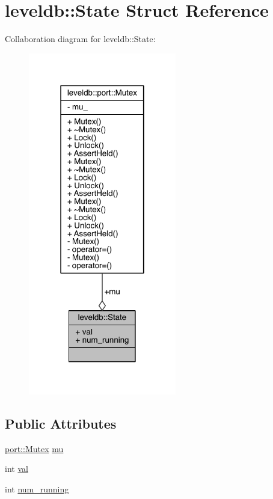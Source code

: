 \hypertarget{structleveldb_1_1_state}{}\section{leveldb\+:\+:State Struct Reference}
\label{structleveldb_1_1_state}


Collaboration diagram for leveldb\+:\+:State\+:\nopagebreak
\begin{figure}[H]
\begin{center}
\leavevmode
\includegraphics[width=183pt]{structleveldb_1_1_state__coll__graph}
\end{center}
\end{figure}
\subsection*{Public Attributes}
\begin{DoxyCompactItemize}
\item 
\hyperlink{classleveldb_1_1port_1_1_mutex}{port\+::\+Mutex} \hyperlink{structleveldb_1_1_state_aa5b0e460a6a87debeb211c47dce8ddd3}{mu}
\item 
int \hyperlink{structleveldb_1_1_state_adfc3479f732e7396e735991e48963981}{val}
\item 
int \hyperlink{structleveldb_1_1_state_a6e84d8550d17c6c3edda2e114a634e61}{num\+\_\+running}
\end{DoxyCompactItemize}


